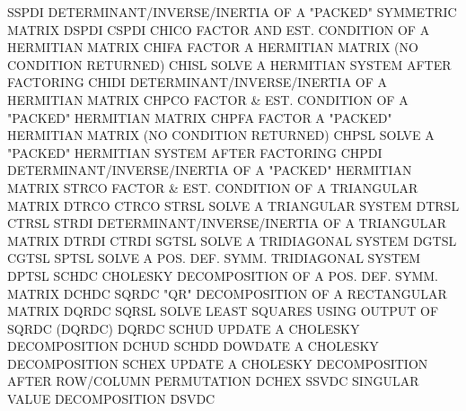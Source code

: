 {\eightpoint\begintt
SSPDI     DETERMINANT/INVERSE/INERTIA OF A "PACKED" SYMMETRIC MATRIX
DSPDI
CSPDI
\endtt}
{\eightpoint\begintt
CHICO     FACTOR AND EST. CONDITION OF A HERMITIAN MATRIX
CHIFA     FACTOR A HERMITIAN MATRIX (NO CONDITION RETURNED)
CHISL     SOLVE A HERMITIAN SYSTEM AFTER FACTORING
CHIDI     DETERMINANT/INVERSE/INERTIA OF A HERMITIAN MATRIX
CHPCO     FACTOR & EST. CONDITION OF A "PACKED" HERMITIAN MATRIX
CHPFA     FACTOR A "PACKED" HERMITIAN MATRIX (NO CONDITION RETURNED)
CHPSL     SOLVE A "PACKED" HERMITIAN SYSTEM AFTER FACTORING
CHPDI     DETERMINANT/INVERSE/INERTIA OF A "PACKED" HERMITIAN MATRIX
\endtt}
{\eightpoint\begintt
STRCO     FACTOR & EST. CONDITION OF A TRIANGULAR MATRIX
DTRCO
CTRCO
\endtt}
{\eightpoint\begintt
STRSL     SOLVE A TRIANGULAR SYSTEM
DTRSL
CTRSL
\endtt}
{\eightpoint\begintt
STRDI     DETERMINANT/INVERSE/INERTIA OF A TRIANGULAR MATRIX
DTRDI
CTRDI
\endtt}
{\eightpoint\begintt
SGTSL     SOLVE A TRIDIAGONAL SYSTEM
DGTSL
CGTSL
\endtt}
{\eightpoint\begintt
SPTSL     SOLVE A POS. DEF. SYMM. TRIDIAGONAL SYSTEM
DPTSL
\endtt}
{\eightpoint\begintt
SCHDC     CHOLESKY DECOMPOSITION OF A POS. DEF. SYMM. MATRIX
DCHDC
\endtt}
{\eightpoint\begintt
SQRDC     "QR" DECOMPOSITION OF A RECTANGULAR MATRIX
DQRDC
\endtt}
{\eightpoint\begintt
SQRSL     SOLVE LEAST SQUARES USING OUTPUT OF SQRDC (DQRDC)
DQRDC
\endtt}
{\eightpoint\begintt
SCHUD     UPDATE A CHOLESKY DECOMPOSITION
DCHUD
\endtt}
{\eightpoint\begintt
SCHDD     DOWDATE A CHOLESKY DECOMPOSITION
\endtt}
{\eightpoint\begintt
SCHEX     UPDATE A CHOLESKY DECOMPOSITION AFTER ROW/COLUMN PERMUTATION
DCHEX
\endtt}
{\eightpoint\begintt
SSVDC     SINGULAR VALUE DECOMPOSITION
DSVDC
\endtt}
